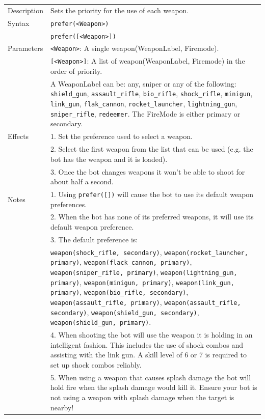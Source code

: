 \documentclass[11pt,a4paper]{article}
\begin{document}
\begin{small}
\begin{tabular}{p{2cm}p{9cm}}
Description & Sets the priority for the use of each weapon.\\
Syntax & \verb|prefer(<Weapon>)|\\
	& \verb|prefer([<Weapon>])|\\

Parameters 
	& \verb|<Weapon>|: A single weapon(WeaponLabel, Firemode). \\
	& \verb|[<Weapon>]|: A list of weapon(WeaponLabel, Firemode) in the order of priority. \\
	& A WeaponLabel can be: any, sniper or any of the following: \verb|shield_gun|, \verb|assault_rifle|, \verb|bio_rifle|, \verb|shock_rifle|, \verb|minigun|, \verb|link_gun|, \verb|flak_cannon|, \verb|rocket_launcher|, \verb|lightning_gun|, \verb|sniper_rifle|, \verb|redeemer|. The FireMode is either primary or secondary. \\

Effects & 
	1.	Set the preference used to select a weapon.\\
&	2.	Select the first weapon from the list that can be used (e.g. the bot has the weapon and it is loaded).\\
&	3.	Once the bot changes weapons it won't be able to shoot for about half a second.\\
Notes 
&	1.	Using \verb|prefer([])| will cause the bot to use its default weapon preferences. \\
&	2. 	When the bot has none of its preferred weapons, it will use its default weapon preference. \\
&	3.	The default preference is: \\
&	 \verb|weapon(shock_rifle, secondary)|, \verb|weapon(rocket_launcher, primary)|, \verb|weapon(flack_cannon, primary)|, \verb|weapon(sniper_rifle, primary)|, \verb|weapon(lightning_gun, primary)|, \verb|weapon(minigun, primary)|, \verb|weapon(link_gun, primary)|, \verb|weapon(bio_rifle, secondary)|, \verb|weapon(assault_rifle, primary)|, \verb|weapon(assault_rifle, secondary)|, \verb|weapon(shield_gun, secondary)|, \verb|weapon(shield_gun, primary)|.\\
&	4. 	When shooting the bot will use the weapon it is holding in an intelligent fashion. This includes the use of shock combos and assisting with the link gun. A skill level of 6 or 7 is required to set up shock combos reliably.\\
& 	5. When using a weapon that causes splash damage the bot will hold fire when the splash damage would kill it. Ensure your bot is not using a weapon with splash damage when the target is nearby!\\

\end{tabular}
\end{small}
\end{document}
